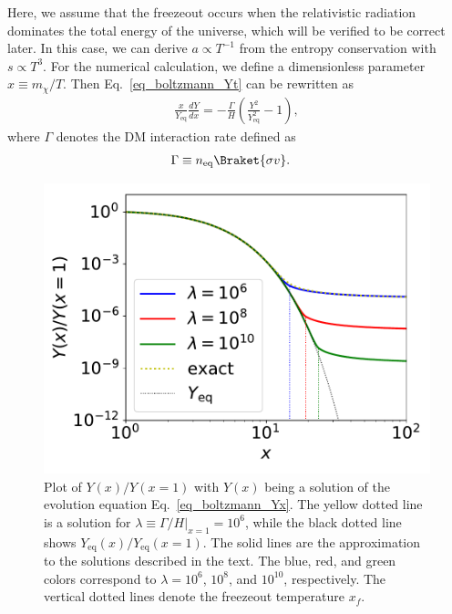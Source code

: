\documentclass[12pt,twoside,book]{article}
\begin{document}
Here, we assume that the freezeout occurs when the relativistic radiation dominates the total energy of the universe, which will be verified to be correct later.
In this case, we can derive $a \propto T^{-1}$ from the entropy conservation with $s \propto T^3$.
For the numerical calculation, we define a dimensionless parameter $x \equiv m_\chi / T$.
Then Eq.~\eqref{eq_boltzmann_Yt} can be rewritten as
\begin{align}
  \frac{x}{Y_{\mathrm{eq}}} \frac{d Y}{d x} =
  -\frac{\Gamma}{H} \left( \frac{Y^2}{Y_{\mathrm{eq}}^2} - 1 \right),\label{eq_boltzmann_Yx}
\end{align}
where $\Gamma$ denotes the DM interaction rate defined as
\begin{align}
  \Gamma &\equiv n_{\mathrm{eq}} \Braket{\sigma v}.\label{eq_lambda}
\end{align}

\begin{figure}[t]
  \centering
  \includegraphics[width=0.5\hsize]{DMrelic.pdf}
  \caption{
    Plot of $Y(x) / Y(x=1)$ with $Y(x)$ being a solution of the evolution equation Eq.~\eqref{eq_boltzmann_Yx}.
    The yellow dotted line is a solution for $\lambda \equiv \left. \Gamma / H \right|_{x=1} = 10^6$, while the black dotted line shows $Y_{\mathrm{eq}} (x) / Y_{\mathrm{eq}} (x=1)$.
    The solid lines are the approximation to the solutions described in the text.
    The blue, red, and green colors correspond to $\lambda = 10^6$, $10^8$, and $10^{10}$, respectively.
    The vertical dotted lines denote the freezeout temperature $x_f$.
  }
  \label{fig_DM_relic}
\end{figure}
\end{document}
